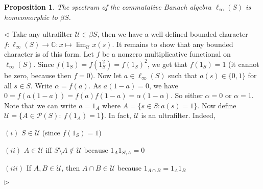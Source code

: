 \documentclass[12pt]{article}
\newtheorem{proposition}[theorem]{Proposition}
\newenvironment{proof}{\par $\triangleleft$}{$\triangleright$}
\begin{document}
\begin{proposition} The spectrum of the commutative Banach algebra
    $\ell_\infty(S)$ is homeomorphic to $\beta S$.
\end{proposition}
\begin{proof} Take any ultrafilter $\mathcal{U}\in\beta S$, then we have a well
    defined bounded character
    $f:\ell_\infty(S)\to\mathbb{C}:x\mapsto\lim_{\mathcal{U}}x(s)$. It remains
    to show that any bounded character is of this form. Let $f$ be a nonzero
    multiplicative functional on $\ell_\infty(S)$. Since
    $f(1_S)=f(1_S^2)={f(1_S)}^2$, we get that $f(1_S)=1$ (it cannot be zero,
    because then $f=0$). Now let $a\in\ell_\infty(S)$ such that $a(s)\in
        \{0,1\}$ for all $s\in S$. Write $\alpha=f(a)$. As $a(1-a)=0$, we have
    $0=f(a(1-a))=f(a)f(1-a)=\alpha(1-\alpha)$. So either $\alpha=0$ or
    $\alpha=1$. Note that we can write $a=1_A$ where $A=\{s\in S: a(s)=1\}$. Now
    define $ \mathcal U=\{A\in\mathcal{P}(S):\ f(1_A)=1\}$. In fact, $\mathcal
        U$ is an ultrafilter. Indeed,

    $(i)$ $S\in\mathcal U$ (since $f(1_S)=1$)

    $(ii)$ $A\in\mathcal{U}$ iff $S\setminus A\notin\mathcal{U}$ because $1_A
        1_{S\setminus A}=0$

    $(iii)$ If $A,B\in\mathcal{U}$, then $A\cap B\in\mathcal{U}$ because
    $1_{A\cap B}=1_A 1_B$


\end{proof}
\end{document}
